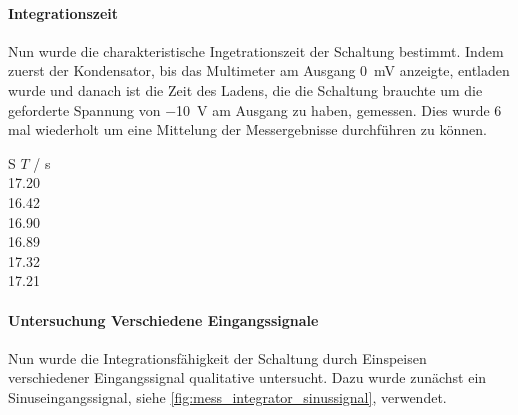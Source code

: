 \documentclass[12pt,english,ngerman]{scrartcl}
\begin{document}
\paragraph{Integrationszeit}
Nun wurde die charakteristische Ingetrationszeit der Schaltung bestimmt. Indem
zuerst der Kondensator, bis das Multimeter am Ausgang \SI{0}{\mV} anzeigte,
entladen wurde und danach ist die Zeit des Ladens, die die Schaltung brauchte
um die geforderte Spannung von \SI{-10}{\volt} am Ausgang zu haben, gemessen.
Dies wurde 6 mal wiederholt um eine Mittelung der Messergebnisse durchführen zu
können.

\begin{table}[H]
  \caption{Messungen der Integrationszeit der realen Integratorschaltung aus
  \autoref{fig:sim_integrator_schaltung}, wobei $T$ die Ladezeit bis am Ausgang
  \SI{-10}{\volt} anliegt. Bei einem Ladespannung \SI{91.8}{\milli\volt}, einem
  Widerstand von \SI{21.9}{\kilo\ohm} und einer Kapazität von
  \SI{6.8}{\micro\farad} }
  \label{tab:messungen_integration}
  \centering
  \begin{tabular}[c]{S}
    {$T$ / \si{\second}} \\
    17.20 \\
    16.42 \\
    16.90 \\
    16.89 \\
    17.32 \\
    17.21 \\
  \end{tabular}
\end{table}


\paragraph{Untersuchung Verschiedene Eingangssignale}
Nun wurde die Integrationsfähigkeit der Schaltung durch Einspeisen
verschiedener Eingangssignal qualitative untersucht. Dazu wurde zunächst ein
Sinuseingangssignal, siehe \autoref{fig:mess_integrator_sinussignal}, verwendet.
 
\end{document}
